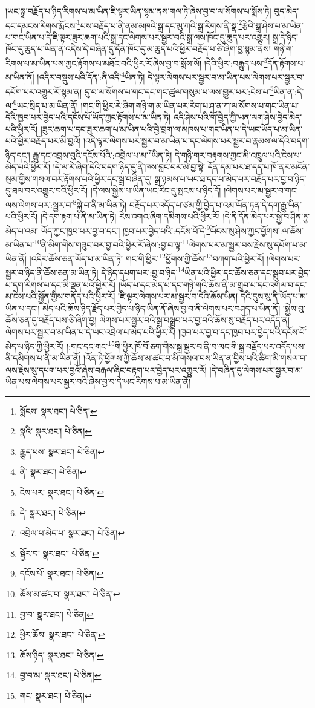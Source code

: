 །ཡང་སྒྲ་བརྗོད་པ་ཉིད་རིགས་པ་མ་ཡིན་ཇི་ལྟར་ཡིན་སྙམ་ནས་གལ་ཏེ་ཞེས་བྱ་བ་ལ་སོགས་པ་སྨོས་ཏེ། བུད་མེད་དང་དམངས་རིགས་རྨོངས་\footnote{སྨོངས་  སྣར་ཐང་།  པེ་ཅིན། }པས་བརྗོད་པ་ནི་ནམ་མཁའི་སྒྲ་དང་མུ་ཀའི་སྒྲ་རིགས་ནི་སྣ་\footnote{སྣའི་  སྣར་ཐང་།  པེ་ཅིན། }རྩེའི་སྒྲ་ཤེས་པ་མ་ཡིན་པ་གང་ཡིན་པ་དེ་ཇི་ལྟར་ཟུར་ཆག་པའི་སྒྲ་དང་ལེགས་པར་སྦྱར་བའི་སྒྲ་ལས་ཁོང་དུ་ཆུད་པར་འགྱུར། སྒྲ་དེ་ཉིད་ཁོང་དུ་ཆུད་པ་ཡིན་ན་འདིས་དེ་བཞིན་དུ་དོན་ཁོང་དུ་མ་ཆུད་པའི་ཕྱིར་བརྗོད་པ་ཅི་ཞིག་བྱ་སྙམ་ནས། གཉི་ག་རིགས་པ་མ་ཡིན་པས་ཀྱང་རྟོགས་པ་མཐོང་བའི་ཕྱིར་རོ་ཞེས་བྱ་བ་སྨོས་སོ། །དེའི་ཕྱིར་:བརྒྱུད་པས་\footnote{རྒྱུད་པས་  སྣར་ཐང་།  པེ་ཅིན། }དོན་རྟོགས་པ་མ་ཡིན་ནོ། །འདིར་བསྡུས་པའི་དོན་:ནི་འདི་\footnote{ནི་  སྣར་ཐང་།  པེ་ཅིན། }ཡིན་ཏེ། དེ་ལྟར་ལེགས་པར་སྦྱར་བ་མ་ཡིན་པས་ལེགས་པར་སྦྱར་བ་དཔོག་པར་འགྱུར་རོ་སྙམ་ན། དུ་བ་ལ་སོགས་པ་གང་དང་གང་ཚུལ་གསུམ་པ་ལས་གྱུར་པར་:ངེས་པ་\footnote{ངེས་པར་  སྣར་ཐང་།  པེ་ཅིན། }ཡིན་ན་:དེ་ལ་\footnote{དེ་  སྣར་ཐང་།  པེ་ཅིན། }ཡང་སྲིད་པ་མ་ཡིན་ནོ། །གང་གི་ཕྱིར་རེ་ཞིག་གཉི་ག་མ་ཡིན་པར་རིག་པ་ཤ་ན་ཀ་ལ་སོགས་པ་གང་ཡིན་པ་དེའི་ཁྱབ་པར་བྱེད་པའི་དངོས་པོ་ཡོད་ཀྱང་རྟོགས་པ་མ་ཡིན་ཏེ། འདི་ཤེས་པའི་གོ་བྱེད་ཀྱི་ཡན་ལག་ཤེས་བྱེད་མེད་པའི་ཕྱིར་རོ། །ཟུར་ཆག་པ་དང་ཟུར་ཆག་པ་མ་ཡིན་པའི་བྱེ་བྲག་ལ་མཁས་པ་གང་ཡིན་པ་དེ་ཡང་ཡོད་པ་མ་ཡིན་པའི་ཕྱིར་བརྗོད་པར་མི་བྱའོ། །འདི་ལྟར་ལེགས་པར་སྦྱར་བ་མ་ཡིན་པ་དང་ལེགས་པར་སྦྱར་བ་རྣམས་ལ་དེའི་བདག་ཉིད་དང་། རྒྱུ་དང་འབྲས་བུའི་དངོས་པོའི་:འབྲེལ་པ་མ་\footnote{འབྲེལ་པ་མེད་པ་  སྣར་ཐང་།  པེ་ཅིན། }ཡིན་ཏེ། དེ་གཉི་གར་བརྟགས་ཀྱང་མི་འཁྲུལ་པའི་ངེས་པ་མེད་པའི་ཕྱིར་རོ། །དེ་ལ་རེ་ཞིག་དེའི་བདག་ཉིད་དུ་ནི་ཁས་བླང་བར་མི་བྱ་སྟེ། དོན་དམ་པར་ཐ་དད་པ་ཁོ་ནར་མངོན་སུམ་གྱིས་གསལ་བར་རྟོགས་པའི་ཕྱིར་དང་སྒྲ་བཞིན་དུ། སྒྲ་ཉམས་པ་ཡང་ཐ་དད་པ་མེད་པར་བརྗོད་པར་བྱ་བ་ཉིད་དུ་ཐལ་བར་འགྱུར་བའི་ཕྱིར་རོ། །དེ་ལས་སྐྱེས་པ་ཡིན་ཡང་རིང་དུ་སྤངས་པ་ཉིད་དོ། །ལེགས་པར་མ་སྦྱར་བ་གང་ལས་ལེགས་པར་:སྦྱར་བ་\footnote{སྦྱོར་བ་  སྣར་ཐང་།  པེ་ཅིན། }སྐྱེ་བ་ནི་མ་ཡིན་ཏེ། བརྗོད་པར་འདོད་པ་ཙམ་གྱི་བྱེད་པ་འམ་ཡོན་ཏན་དེ་དག་རྒྱུ་ཡིན་པའི་ཕྱིར་རོ། །དེ་དག་རྟག་པ་ནི་མ་ཡིན་ཏེ། རེས་འགའ་ཞིག་དམིགས་པའི་ཕྱིར་རོ། །དེ་ནི་དོན་མེད་པར་སྐྱེ་བ་ཤིན་ཏུ་མེད་པ་འམ། ཡོད་ཀྱང་ཁྱབ་པར་བྱ་བ་དང་། ཁྱབ་པར་བྱེད་པའི་:དངོས་པོ་དེ་\footnote{དངོས་པོ་  སྣར་ཐང་།  པེ་ཅིན། }ཡོངས་སུ་ཤེས་ཀྱང་ཕྱོགས་:ལ་ཆོས་མ་ཡིན་པ་\footnote{ཆོས་མ་ཚང་བ་  སྣར་ཐང་།  པེ་ཅིན། }ནི་མིག་གིས་གཟུང་བར་བྱ་བའི་ཕྱིར་རོ་ཞེས་:བྱ་བ་ལྟ་\footnote{བྱ་བ་  སྣར་ཐང་།  པེ་ཅིན། }ལེགས་པར་མ་སྦྱར་བས་རྗེས་སུ་དཔོག་པ་མ་ཡིན་ནོ། །འདིར་ཆོས་ཅན་ཡོད་པ་མ་ཡིན་ཏེ། གང་གི་ཕྱིར་\footnote{ཕྱིར་ཆོས་  སྣར་ཐང་།  པེ་ཅིན། }ཕྱོགས་ཀྱི་ཆོས་\footnote{ཆོས་ཉིད་  སྣར་ཐང་།  པེ་ཅིན། }བཀག་པའི་ཕྱིར་རོ། །ལེགས་པར་སྦྱར་བ་ཉིད་ནི་ཆོས་ཅན་མ་ཡིན་ཏེ། དེ་ཉིད་དཔག་པར་:བྱ་བ་ཉིད་\footnote{བྱ་བ་མ་  སྣར་ཐང་།  པེ་ཅིན། }ཡིན་པའི་ཕྱིར་དང་ཆོས་ཅན་དང་སྒྲུབ་པར་བྱེད་པ་དག་རིགས་པ་དང་མི་ལྡན་པའི་ཕྱིར་རོ། །ཡོད་པ་དང་མེད་པ་དང་གཉི་གའི་ཆོས་ནི་མ་གྲུབ་པ་དང་འགལ་བ་དང་མ་ངེས་པའི་སྐྱོན་གྱིས་གནོད་པའི་ཕྱིར་རོ། །ཇི་ལྟར་ལེགས་པར་མ་སྦྱར་བ་དེའི་ཆོས་ཡིན། དེའི་དུས་སུ་ནི་ཡོད་པ་མ་ཡིན་པ་དང་། མེད་པའི་ཆོས་ཉིད་རྗོད་པར་བྱེད་པ་ཉིད་ཡིན་ནོ་ཞེས་བྱ་བ་ནི་ལེགས་པར་བཤད་པ་ཡིན་ནོ། །སྐྱེས་བུ་ཆོས་ཅན་དུ་བརྗོད་པས་ཅི་ཞིག་བྱ། ལེགས་པར་སྦྱར་བའི་སྒྲ་བསྒྲུབ་པར་བྱ་བའི་ཆོས་སུ་བརྗོད་པར་འདོད་ན། ལེགས་པར་སྦྱར་བ་མ་ཡིན་པ་དེ་ཡང་འབྲེལ་པ་མེད་པའི་ཕྱིར་རོ། །ཁྱབ་པར་བྱ་བ་དང་ཁྱབ་པར་བྱེད་པའི་དངོས་པོ་མེད་པ་ཉིད་ཀྱི་ཕྱིར་རོ། །:གང་དང་གང་\footnote{གང་  སྣར་ཐང་།  པེ་ཅིན། }གི་ཕྱིར་ཁོ་བོ་ཅག་གིས་སྒྲ་སྦྱར་བ་ནི་བ་ལང་གི་སྒྲ་བརྗོད་པར་འདོད་པས་ནི་དམིགས་པ་ནི་མ་ཡིན་ནོ། །འོན་ཏེ་ཕྱོགས་ཀྱི་ཆོས་མ་ཚང་བ་མི་གསལ་བས་ཡིན་ན་བྱིས་པའི་ཚིག་མི་གསལ་བ་ལས་རྗེས་སུ་དཔག་པར་བྱའོ་ཞེས་བརྒལ་ཞིང་བརྟག་པར་བྱེད་པར་འགྱུར་རོ། །དེ་བཞིན་དུ་ལེགས་པར་སྦྱར་བ་མ་ཡིན་པས་ལེགས་པར་སྦྱར་བའི་ཞེས་བྱ་བ་དེ་ཡང་རིགས་པ་མ་ཡིན་ནོ། 